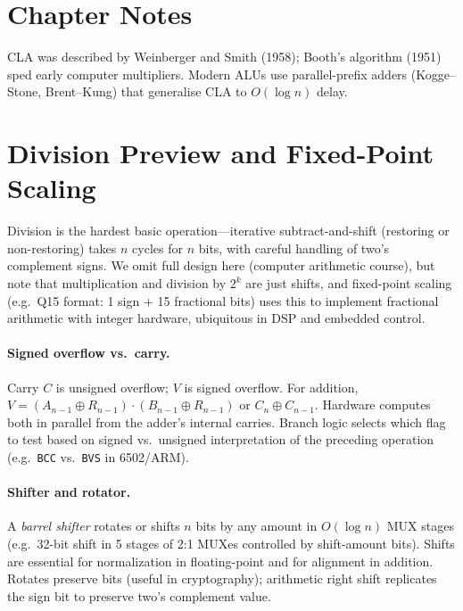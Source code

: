 
\section{Chapter Notes}
CLA was described by Weinberger and Smith (1958); Booth's algorithm (1951) sped early computer multipliers.
Modern ALUs use parallel-prefix adders (Kogge--Stone, Brent--Kung) that generalise CLA to $O(\log n)$ delay.

\section{Division Preview and Fixed-Point Scaling}
Division is the hardest basic operation---iterative subtract-and-shift (restoring or non-restoring) takes $n$ cycles for $n$ bits,
with careful handling of two's complement signs. We omit full design here (computer arithmetic course), but note that multiplication
and division by $2^k$ are just shifts, and fixed-point scaling (e.g.\ Q15 format: 1 sign + 15 fractional bits) uses this to implement
fractional arithmetic with integer hardware, ubiquitous in DSP and embedded control.


\paragraph{Signed overflow vs.\ carry.} Carry $C$ is unsigned overflow; $V$ is signed overflow. For addition,
$V = (A_{n-1}\!\oplus\!R_{n-1})\cdot(B_{n-1}\!\oplus\!R_{n-1})$ or $C_n\!\oplus\!C_{n-1}$. Hardware computes both
in parallel from the adder's internal carries. Branch logic selects which flag to test based on signed vs.\ unsigned
interpretation of the preceding operation (e.g.\ \texttt{BCC} vs.\ \texttt{BVS} in 6502/ARM).

\paragraph{Shifter and rotator.} A \emph{barrel shifter} rotates or shifts $n$ bits by any amount in $O(\log n)$ MUX stages
(e.g.\ 32-bit shift in 5 stages of 2:1 MUXes controlled by shift-amount bits). Shifts are essential for normalization in
floating-point and for alignment in addition. Rotates preserve bits (useful in cryptography); arithmetic right shift replicates
the sign bit to preserve two's complement value.

